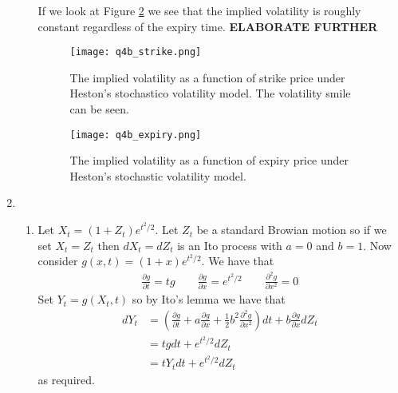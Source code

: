 \documentclass[10pt,english]{article}
\theoremstyle{plain}
\begin{document}
\begin{enumerate}
\begin{enumerate}
If we look at Figure \ref{hesexpiry} we see that the implied volatility is roughly constant regardless of the expiry time. \textbf{ELABORATE FURTHER}
\begin{figure}
\begin{center}
\texttt{[image: q4b\_strike.png]}
\caption{The implied volatility as a function of strike price under Heston's stochastico volatility model. The volatility smile can be seen.}
\label{hesstrike}
\end{center}
\end{figure}
\begin{figure}
\begin{center}
\texttt{[image: q4b\_expiry.png]}
\caption{The implied volatility as a function of expiry price under Heston's stochastic volatility model.}
\label{hesexpiry}
\end{center}
\end{figure}
\end{enumerate}
\item
\begin{enumerate}
\item Let $X_{t}=(1+Z_{t})e^{t^{2}/2}$. Let $Z_{t}$ be a standard Browian motion so if we set $X_{t}=Z_{t}$ then $dX_{t} = dZ_{t}$ is an Ito process with $a=0$ and $b=1$. Now consider $g(x,t)=(1+x)e^{t^{2}/2}$. We have that
\begin{align*}
\frac{\partial g}{\partial t} = tg \qquad \frac{\partial g}{\partial x}= e^{t^{2}/2} \qquad \frac{\partial^{2}g}{\partial x^{2}} = 0
\end{align*}
Set $Y_{t}=g(X_{t},t)$ so by Ito's lemma we have that
\begin{align*}
dY_{t} &= \left(\frac{\partial g}{\partial t} + a\frac{\partial g}{\partial x} + \frac{1}{2}b^{2}\frac{\partial^{2}g}{\partial x^{2}}\right)dt+b\frac{\partial g}{\partial x}dZ_{t}\\
&= tg dt + e^{t^{2}/2}dZ_{t}\\
&= tY_{t} dt + e^{t^{2}/2}dZ_{t}
\end{align*}
as required.


\end{enumerate}
\end{enumerate}
\end{document}
